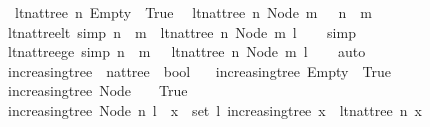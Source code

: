 \begin{isabellebody}
\ \ {\isachardoublequoteopen}lt{\isacharunderscore}nat{\isacharunderscore}tree\ n\ Empty\ {\isacharequal}\ True{\isachardoublequoteclose}\ \isanewline
{\isacharbar}\ {\isachardoublequoteopen}lt{\isacharunderscore}nat{\isacharunderscore}tree\ n\ {\isacharparenleft}Node\ m\ {\isacharunderscore}{\isacharparenright}\ {\isacharequal}\ {\isacharparenleft}n\ {\isacharless}\ m{\isacharparenright}{\isachardoublequoteclose}\isanewline
\ \isanewline
{}\isamarkupfalse%
\ lt{\isacharunderscore}nat{\isacharunderscore}tree{\isacharunderscore}lt\ {\isacharbrackleft}simp{\isacharbrackright}{\isacharcolon}\ {\isachardoublequoteopen}{\isacharparenleft}n\ {\isacharless}\ m{\isacharparenright}\ {\isasymlongleftrightarrow}\ lt{\isacharunderscore}nat{\isacharunderscore}tree\ n\ {\isacharparenleft}Node\ m\ l{\isacharparenright}{\isachardoublequoteclose}\isanewline
%
\isadelimproof
\ \ %
\endisadelimproof
%
\isatagproof
{}\isamarkupfalse%
\ simp%
\endisatagproof
{\isafoldproof}%
%
\isadelimproof
\isanewline
%
\endisadelimproof
\ \ \ \ \isanewline
{}\isamarkupfalse%
\ lt{\isacharunderscore}nat{\isacharunderscore}tree{\isacharunderscore}ge\ {\isacharbrackleft}simp{\isacharbrackright}{\isacharcolon}\ {\isachardoublequoteopen}{\isacharparenleft}n\ {\isasymge}\ m{\isacharparenright}\ {\isasymlongleftrightarrow}\ {\isasymnot}\ lt{\isacharunderscore}nat{\isacharunderscore}tree\ n\ {\isacharparenleft}Node\ m\ l{\isacharparenright}{\isachardoublequoteclose}\isanewline
%
\isadelimproof
\ \ %
\endisadelimproof
%
\isatagproof
{}\isamarkupfalse%
\ auto%
\endisatagproof
{\isafoldproof}%
%
\isadelimproof
\isanewline
%
\endisadelimproof
\ \ \isanewline
{}\isamarkupfalse%
\ increasing{\isacharunderscore}tree\ {\isacharcolon}{\isacharcolon}\ {\isachardoublequoteopen}nattree\ {\isasymRightarrow}\ bool{\isachardoublequoteclose}\ \isanewline
\ \ {\isachardoublequoteopen}increasing{\isacharunderscore}tree\ Empty\ {\isacharequal}\ True{\isachardoublequoteclose}\isanewline
{\isacharbar}\ {\isachardoublequoteopen}increasing{\isacharunderscore}tree\ {\isacharparenleft}Node\ {\isacharunderscore}\ {\isacharbrackleft}{\isacharbrackright}{\isacharparenright}\ {\isacharequal}\ True{\isachardoublequoteclose}\ \isanewline
{\isacharbar}\ {\isachardoublequoteopen}increasing{\isacharunderscore}tree\ {\isacharparenleft}Node\ n\ l{\isacharparenright}\ {\isacharequal}\ {\isacharparenleft}{\isasymforall}x\ {\isasymin}\ set\ l{\isachardot}\ increasing{\isacharunderscore}tree\ x\ {\isasymand}\ lt{\isacharunderscore}nat{\isacharunderscore}tree\ n\ x{\isacharparenright}{\isachardoublequoteclose}\ \ \isanewline

\end{isabellebody}
